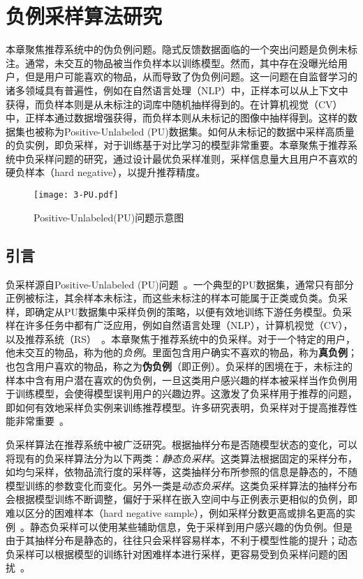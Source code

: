 \chapter{负例采样算法研究}
\label{cha:thirdsection}
本章聚焦推荐系统中的伪负例问题。隐式反馈数据面临的一个突出问题是负例未标注。通常，未交互的物品被当作负样本以训练模型。然而，其中存在没曝光给用户，但是用户可能喜欢的物品，从而导致了伪负例问题。这一问题在自监督学习的诸多领域具有普遍性，例如在自然语言处理（NLP）中，正样本可以从上下文中获得，而负样本则是从未标注的词库中随机抽样得到的。在计算机视觉（CV）中，正样本通过数据增强获得，而负样本则从未标记的图像中抽样得到。这样的数据集也被称为Positive-Unlabeled (PU)数据集。如何从未标记的数据中采样高质量的负实例，即负采样，对于训练基于对比学习的模型非常重要。本章聚焦于推荐系统中负采样问题的研究，通过设计最优负采样准则，采样信息量大且用户不喜欢的硬负样本（hard negative），以提升推荐精度。
\begin{figure*}[h!]
	\centering
	\texttt{[image: 3-PU.pdf]}
	\caption{Positive-Unlabeled(PU)问题示意图}
	\label{Fig:falsen}
\end{figure*}
\section{引言}
负采样源自Positive-Unlabeled (PU)问题~\cite{Jessa:2020:ML,Su:2021:IJCAI}。一个典型的PU数据集，通常只有部分正例被标注，其余样本未标注，而这些未标注的样本可能属于正类或负类。负采样，即确定从PU数据集中采样负例的策略，以便有效地训练下游任务模型。负采样在许多任务中都有广泛应用，例如自然语言处理（NLP）\cite{Mikolov:2013:NIPS,Tang:2015:WWW}，计算机视觉（CV）\cite{Qin:2021:AAAI,Zhao:2021:IJCAI}，以及推荐系统（RS）~\cite{Steffen:2014:WSDM,Zhang:2013:SIGIR,Ding:2020:NIPS}。本章聚焦于推荐系统中的负采样。对于一个特定的用户，他未交互的物品，称为他的\textit{负例}。里面包含用户确实不喜欢的物品，称为\textbf{真负例}；也包含用户喜欢的物品，称之为\textbf{伪负例}（即正例）。负采样的困境在于，未标注的样本中含有用户潜在喜欢的伪负例，一旦这类用户感兴趣的样本被采样当作负例用于训练模型，会使得模型误判用户的兴趣边界。这激发了负采样用于推荐的问题，即如何有效地采样负实例来训练推荐模型。许多研究表明，负采样对于提高推荐性能非常重要~\cite{Steffen:2014:WSDM,Zhang:2013:SIGIR,Ding:2020:NIPS,Park:2019:WWW,Huang:2021:KDD,Ding:2019:IJCAI,Yang:2020:KDD}。

负采样算法在推荐系统中被广泛研究。根据抽样分布是否随模型状态的变化，可以将现有的负采样算法分为以下两类：\textit{静态负采样}\cite{Steffen:2009:UAI,Chen:2017:KDD,Mikolov:2013:NIPS,Xiangnan:2020:SIGIR,Weike:2013:IJCAI,Yu:2018:CIKM,Wang:2019:SIGIR}。这类算法根据固定的采样分布，如均匀采样，依物品流行度的采样等，这类抽样分布所参照的信息是静态的，不随模型训练的参数变化而变化。另外一类是\textit{动态负采样}\cite{Steffen:2014:WSDM,Zhang:2013:SIGIR,Wang:2020:WWW,Chen:2019:WWW}。这类负采样算法的抽样分布会根据模型训练不断调整，偏好于采样在嵌入空间中与正例表示更相似的负例，即难以区分的困难样本（hard negative sample），例如采样分数更高或排名更高的实例~\cite{Steffen:2014:WSDM,Zhang:2013:SIGIR,Zhao:2015:CIKM}。静态负采样可以使用某些辅助信息，免于采样到用户感兴趣的伪负例。但是由于其抽样分布是静态的，往往只会采样容易样本，不利于模型性能的提升；动态负采样可以根据模型的训练针对困难样本进行采样，更容易受到负采样问题的困扰~\cite{Ding:2020:NIPS,Qin:2021:AAAI,Zhao:2021:IJCAI}。

